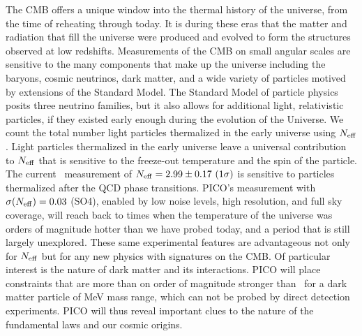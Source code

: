 \documentclass[PICOReport.tex]{subfiles}
\begin{document}
The CMB offers a unique window into the thermal history of the universe, from the time of reheating through today.  It is during these eras that the matter and radiation that fill the universe were produced and evolved to form the structures observed at low redshifts.  Measurements of the CMB on small angular scales are sensitive to the many components that make up the universe including the baryons, cosmic neutrinos, dark matter, and a wide variety of particles motived by extensions of the Standard Model.  The Standard Model of particle physics posits three neutrino families, but it also allows for additional light, relativistic particles, if they existed early enough during the evolution of the Universe.   We count the total number light particles thermalized in the early universe using ${N_{\rm eff}}$. Light particles thermalized in the early universe leave a universal contribution to ${N_{\rm eff}}$ that is sensitive to the freeze-out temperature and the spin of the particle.  The current \planck\ measurement of ${N_{\rm eff}} = 2.99 \pm 0.17 \,\, (1\sigma)$ is sensitive to particles thermalized after the QCD phase transitions. PICO's measurement with $\sigma({N_{\rm eff}})=0.03$ (SO4), enabled by low noise levels, high resolution, and full sky coverage, will reach back to times when the temperature of the universe was orders of magnitude hotter than we have probed today, and a period that is still largely unexplored.   
These same experimental features are advantageous not only for ${N_{\rm eff}}$ but for any new physics with signatures on the CMB. Of particular interest is the nature of dark matter and its interactions. PICO will place constraints that are more than on order of magnitude stronger than \planck\ for a dark matter particle of MeV mass range, which can not be probed by direct detection experiments. PICO will thus reveal important clues to the nature of the fundamental laws and our cosmic origins. 


\end{document}
